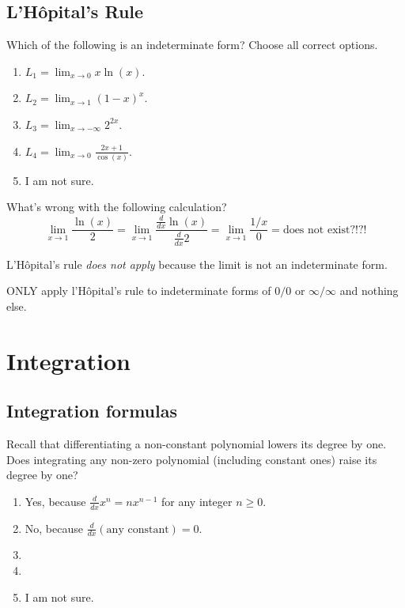 \documentclass[aspectratio=169, 14pt, t]{beamer}  %
\begin{document}
\subsection{L'H\^opital's Rule}

\begin{poll}
  Which of the following is an indeterminate form? Choose all correct options.

  \begin{enumerate}
    \item \(L_{1} = \lim_{x \to 0} x \ln(x)\).
    \item \(L_{2} = \lim_{x \to 1} (1 - x)^{x}\).
    \item \(L_{3} = \lim_{x \to -\infty} 2^{2x}\).
    \item \(L_{4} = \lim_{x \to 0} \frac{2x+1}{\cos(x)}\).
    \item I am not sure.
  \end{enumerate}
\end{poll}

\begin{poll}
  What's wrong with the following calculation?
  \[
    \lim_{x \to 1} \frac{\ln(x)}{2} = \lim_{x \to 1} \frac{\frac{d}{dx} \ln(x)}{\frac{d}{dx} 2} = \lim_{x \to 1} \frac{1/x}{0} = \text{does not exist?!?!}
  \]



  \pause{}

  L'H\^opital's rule \emph{does not apply} because the limit is not an indeterminate form.

  ONLY apply l'H\^opital's rule to indeterminate forms of \(0/0\) or \(\infty/\infty\) and nothing else.
\end{poll}

\section{Integration}

\subsection{Integration formulas}

\begin{poll}
  Recall that differentiating a {\color{red} non-constant polynomial} lowers its degree by one. Does integrating any {\color{red} non-zero polynomial} (including constant ones) raise its degree by one?

  \begin{enumerate}
    \item Yes, because \(\frac{d}{dx} x^{n} = n x^{n-1}\) for any integer \(n \ge 0\).
    \item No, because \(\frac{d}{dx} (\text{any constant}) = 0\).
    \item
    \item
    \item I am not sure.
  \end{enumerate}
\end{poll}
\end{document}
